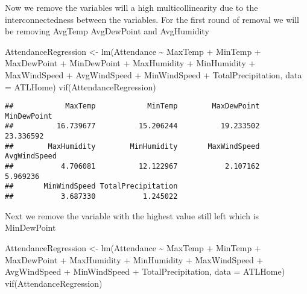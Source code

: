 \documentclass[
]{article}
\newenvironment{Shaded}{\begin{snugshade}}{\end{snugshade}}
\newcommand{\AttributeTok}[1]{\textcolor[rgb]{0.77,0.63,0.00}{#1}}
\newcommand{\FunctionTok}[1]{\textcolor[rgb]{0.00,0.00,0.00}{#1}}
\newcommand{\NormalTok}[1]{#1}
\newcommand{\OtherTok}[1]{\textcolor[rgb]{0.56,0.35,0.01}{#1}}
\newcommand{\SpecialCharTok}[1]{\textcolor[rgb]{0.00,0.00,0.00}{#1}}
\begin{document}
Now we remove the variables will a high multicollinearity due to the
interconnectedness between the variables. For the first round of removal
we will be removing AvgTemp AvgDewPoint and AvgHumidity

\begin{Shaded}
\begin{Highlighting}[]
\NormalTok{AttendanceRegression }\OtherTok{\textless{}{-}} \FunctionTok{lm}\NormalTok{(Attendance }\SpecialCharTok{\textasciitilde{}}\NormalTok{ MaxTemp }\SpecialCharTok{+}\NormalTok{ MinTemp }\SpecialCharTok{+}\NormalTok{ MaxDewPoint }\SpecialCharTok{+}\NormalTok{ MinDewPoint }\SpecialCharTok{+}\NormalTok{ MaxHumidity }\SpecialCharTok{+}\NormalTok{ MinHumidity }\SpecialCharTok{+}\NormalTok{ MaxWindSpeed }\SpecialCharTok{+}\NormalTok{ AvgWindSpeed }\SpecialCharTok{+}\NormalTok{ MinWindSpeed }\SpecialCharTok{+}\NormalTok{ TotalPrecipitation, }\AttributeTok{data =}\NormalTok{ ATLHome)}
\FunctionTok{vif}\NormalTok{(AttendanceRegression)}
\end{Highlighting}
\end{Shaded}

\begin{verbatim}
##            MaxTemp            MinTemp        MaxDewPoint        MinDewPoint 
##          16.739677          15.206244          19.233502          23.336592 
##        MaxHumidity        MinHumidity       MaxWindSpeed       AvgWindSpeed 
##           4.706081          12.122967           2.107162           5.969236 
##       MinWindSpeed TotalPrecipitation 
##           3.687330           1.245022
\end{verbatim}

Next we remove the variable with the highest value still left which is
MinDewPoint

\begin{Shaded}
\begin{Highlighting}[]
\NormalTok{AttendanceRegression }\OtherTok{\textless{}{-}} \FunctionTok{lm}\NormalTok{(Attendance }\SpecialCharTok{\textasciitilde{}}\NormalTok{ MaxTemp }\SpecialCharTok{+}\NormalTok{ MinTemp }\SpecialCharTok{+}\NormalTok{ MaxDewPoint }\SpecialCharTok{+}\NormalTok{ MaxHumidity }\SpecialCharTok{+}\NormalTok{ MinHumidity }\SpecialCharTok{+}\NormalTok{ MaxWindSpeed }\SpecialCharTok{+}\NormalTok{ AvgWindSpeed }\SpecialCharTok{+}\NormalTok{ MinWindSpeed }\SpecialCharTok{+}\NormalTok{ TotalPrecipitation, }\AttributeTok{data =}\NormalTok{ ATLHome)}
\FunctionTok{vif}\NormalTok{(AttendanceRegression)}
\end{Highlighting}
\end{Shaded}
\end{document}
